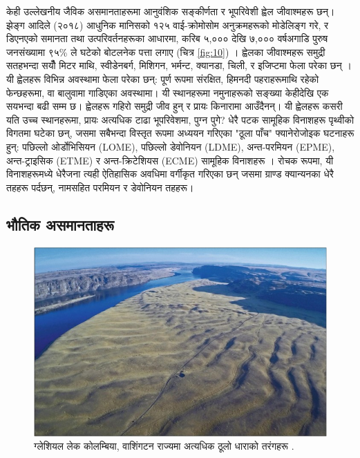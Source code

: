 \documentclass[10pt,twocolumn,letterpaper]{article}
\begin{document}
केही उल्लेखनीय जैविक असमानताहरूमा आनुवंशिक सङ्कीर्णता र भूपरिवेशी ह्वेल जीवाश्महरू छन्। झेङ्ग आदिले (२०१८) आधुनिक मानिसको १२५ वाई-क्रोमोसोम अनुक्रमहरूको मोडेलिङ्ग गरे, र डिएनएको समानता तथा उत्परिवर्तनहरूका आधारमा, करिब ५,००० देखि ७,००० वर्षअगाडि पुरुष जनसंख्यामा ९५\% ले घटेको बोटलनेक पत्ता लगाए (चित्र \ref{fig:10}) \cite{62}। ह्वेलका जीवाश्महरू समुद्री सतहभन्दा सयौँ मिटर माथि, स्वीडेनबर्ग, मिशिगन, भर्मन्ट, क्यानडा, चिली, र इजिप्टमा फेला परेका छन् \cite{63,64,65,66}। यी ह्वेलहरू विभिन्न अवस्थामा फेला परेका छन्: पूर्ण रूपमा संरक्षित, हिमनदी पहराहरूमाथि रहेको फेन्छहरूमा, वा बालुवामा गाडिएका अवस्थामा। यी स्थानहरूमा नमुनाहरूको सङ्ख्या केहीदेखि एक सयभन्दा बढी सम्म छ। ह्वेलहरू गहिरो समुद्री जीव हुन् र प्रायः किनारामा आउँदैनन्। यी ह्वेलहरू कसरी यति उच्च स्थानहरूमा, प्रायः अत्यधिक टाढा भूपरिवेशमा, पुग्न पुगे?
धेरै पटक सामूहिक विनाशहरू पृथ्वीको विगतमा घटेका छन्, जसमा सबैभन्दा विस्तृत रूपमा अध्ययन गरिएका "ठूला पाँच" फ्यानेरोजोइक घटनाहरू हुन्: पछिल्लो ओर्डोभिसियन (LOME), पछिल्लो डेवोनियन (LDME), अन्त-परमियन (EPME), अन्त-ट्राइसिक (ETME) र अन्त-क्रिटेशियस (ECME) सामूहिक विनाशहरू \cite{88,89}। रोचक रूपमा, यी विनाशहरूमध्ये धेरैजना त्यही ऐतिहासिक अवधिमा वर्गीकृत गरिएका छन् जसमा ग्राण्ड क्यान्यनका धेरै तहहरू पर्दछन्, नामसहित परमियन र डेवोनियन तहहरू।

\subsection{भौतिक असमानताहरू}

\begin{figure}[b]
\begin{center}
   \includegraphics[width=1\linewidth]{columbia.jpg}
\end{center}
   \caption{ग्लेशियल लेक कोलम्बिया, वाशिंगटन राज्यमा अत्यधिक ठूलो धाराको तरंगहरू \cite{80}.}
\label{fig:11}
\label{fig:onecol}
\end{figure}
\end{document}
